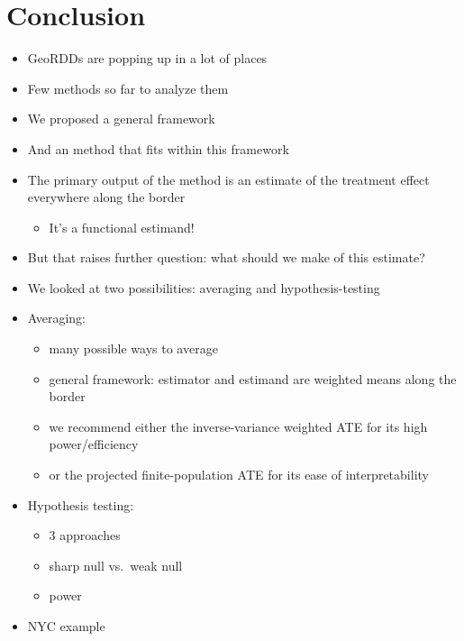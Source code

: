 \documentclass[letter]{article}
\providecommand{\tightlist}{%
      \setlength{\itemsep}{0pt}\setlength{\parskip}{0pt}}
\providecommand{\tightlist}{%
  	  \setlength{\itemsep}{0pt}\setlength{\parskip}{0pt}}
\begin{document}
    	\section{Conclusion}\label{conclusion}
    


    	\begin{itemize}
\tightlist
\item
  GeoRDDs are popping up in a lot of places
\item
  Few methods so far to analyze them
\item
  We proposed a general framework
\item
  And an method that fits within this framework
\item
  The primary output of the method is an estimate of the treatment effect everywhere along the border

  \begin{itemize}
  \tightlist
  \item
    It's a functional estimand!
  \end{itemize}
\item
  But that raises further question: what should we make of this estimate?
\item
  We looked at two possibilities: averaging and hypothesis-testing
\item
  Averaging:

  \begin{itemize}
  \tightlist
  \item
    many possible ways to average
  \item
    general framework: estimator and estimand are weighted means along the border
  \item
    we recommend either the inverse-variance weighted ATE for its high power/efficiency
  \item
    or the projected finite-population ATE for its ease of interpretability
  \end{itemize}
\item
  Hypothesis testing:

  \begin{itemize}
  \tightlist
  \item
    3 approaches
  \item
    sharp null vs.~weak null
  \item
    power
  \end{itemize}
\item
  NYC example
\end{itemize}
    
\end{document}
